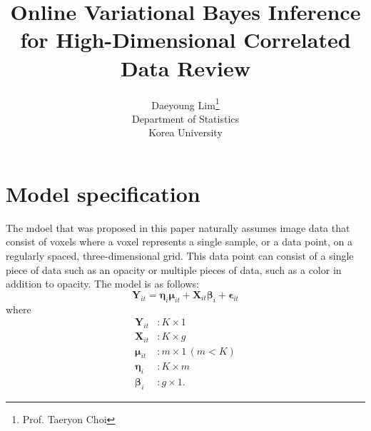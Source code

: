 \documentclass[11pt]{article}
\newcommand{\bs}{\boldsymbol}
\begin{document}
\nocite{*}

\title{Online Variational Bayes Inference for High-Dimensional Correlated Data Review}

\author{Daeyoung Lim\thanks{Prof. Taeryon Choi} \\
Department of Statistics \\
Korea University}

\maketitle
\section{Model specification}
  The mdoel that was proposed in this paper naturally assumes image data that consist of voxels where a voxel represents a single sample, or a data point, on a regularly spaced, three-dimensional grid. This data point can consist of a single piece of data such as an opacity or multiple pieces of data, such as a color in addition to opacity. The model is as follows:
  \begin{equation}
    \mathbf{Y}_{it} = \bs{\eta}_{i}\bs{\mu}_{it} + \mathbf{X}_{it}\bs{\beta}_{i} + \bs{\epsilon}_{it}
  \end{equation}
  where
  \begin{align}
    \mathbf{Y}_{it} &: K \times 1\\
    \mathbf{X}_{it} &: K \times g\\
    \bs{\mu}_{it} &: m \times 1 \, (m < K)\\
    \bs{\eta}_{i} &: K \times m\\
    \bs{\beta}_{i} &: g \times 1.
  \end{align}
\end{document}
